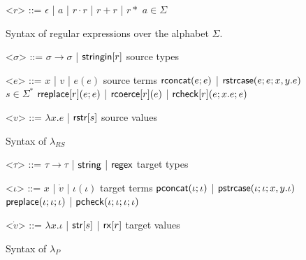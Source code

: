 \documentclass[11pt,leqno]{article}
\theoremstyle{definition}
\newcommand{\lambdap}{\lambda_P}
\newcommand{\sisubst}[3]{{\sf rreplace}[#1](#2;#3)} \newcommand{\rreplace}[3]{{\sf rreplace}[#1](#2;#3)} %
\newcommand{\rcoerce}[2]{{\sf rcoerce}[#1](#2)}
\newcommand{\sistr}[1]{{\sf rstr}[#1]}   \newcommand{\rstr}[1]{{\sf rstr}[#1]} %
\newcommand{\rcheck}[4]{ {\sf rcheck}[#1](#2;#3;#4) }
\newcommand{\strin}[1]{\sistr{#1}}
\newcommand{\rsconcat}[2]{{\sf rconcat}(#1;#2)} \newcommand{\rconcat}[2]{{\sf rconcat}(#1;#2)} %
\newcommand{\stringin}[1]{{\sf stringin}[#1]}
\newcommand{\tcheck}[4]{{\sf pcheck}(#1; #2; #3; #4)}
\renewcommand{\tstr}[1]{{{\sf str}[#1]}}
\newcommand{\preplace}[3]{{\sf preplace}(#1;#2;#3)}
\newcommand{\tconcat}[2]{{\sf pconcat}(#1;#2)} %
\newcommand{\rx}[1]{ {\sf rx}[#1] }
\newcommand{\str}{{\sf string}}
\newcommand{\regex}{{\sf regex}}
\newcommand{\strcase}[3]{ {\sf rstrcase}(#1; #2; #3)}
\newcommand{\pstrcase}[3]{ {\sf pstrcase}(#1; #2; #3)}
\begin{document}





\clearpage
\renewcommand{\grammarlabel}[2]{#1\hfill#2}
\begin{figure}[b]
\small
  \begin{grammar}
<$r$> ::= $\epsilon$ | $a$ | $r \cdot r$ | $r + r$ | $r*$ \hfill $a \in \Sigma$

\caption[Syntax of Regular Expressions]{Syntax of regular expressions over the alphabet $\Sigma$.}
\label{fig:regex}
\end{grammar}
\end{figure}
\begin{figure}[t]
\small
  \begin{grammar}
<$\sigma$> ::=  $\sigma \rightarrow \sigma$ | $\stringin{r}$    \hfill  source types

<$e$> ::= 
      $x$ | $v$ | $e(e)$ \hfill source terms \alt 
      $\rsconcat{e}{e}$ | $\strcase{e}{e}{x,y.e}$ \hfill $s \in \Sigma^{*}$ \alt
      $\sisubst{r}{e}{e}$ | $\rcoerce{r}{e}$ | $\rcheck{r}{e}{x.e}{e}$

<$v$> ::= $\lambda x . e$ | $\strin{s}$ \hfill source values 
\caption{Syntax of $\lambda_{RS}$}
\label{fig:glambdas}
\end{grammar}
\end{figure}


\renewcommand{\grammarlabel}[2]{#1\hfill#2}

\begin{figure}[t]
\small
  \begin{grammar}

<$\tau$> ::= $\tau \rightarrow \tau$ | $\str$ | $\regex$ \hfill target types

<$\iota$> ::= $x$ | $\dot{v}$ | $\iota(\iota)$ \hfill target terms \alt
$\tconcat{\iota}{\iota}$ | $\pstrcase{\iota}{\iota}{x,y.\iota}$ \alt
  $\preplace{\iota}{\iota}{\iota}$ | $\tcheck{\iota}{\iota}{\iota}{\iota}$ 

  <$\dot{v}$> ::= $\lambda x . \iota$ | $\tstr{s}$ | $\rx{r}$ \hfill target values

\end{grammar}
\caption{Syntax of $\lambdap$}
\label{fig:lcsSyntax}
\end{figure}
\end{document}
